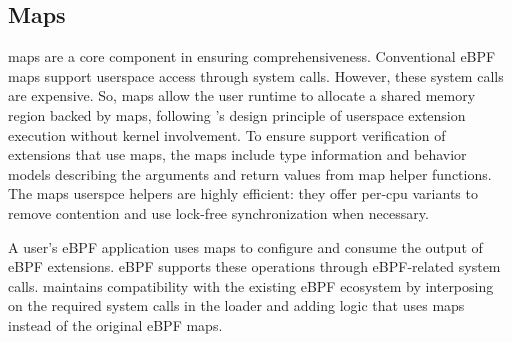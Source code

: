 \subsection{\sys Maps}\label{sec:design:maps}

\sys{} maps are a core component in ensuring comprehensiveness.   Conventional eBPF maps support userspace access through system calls. However, these system calls are expensive. So, \sys{} maps allow the \sys{} user runtime to allocate a shared memory region backed by \sys{} maps, following \sys{}'s design principle of userspace extension execution without kernel involvement. %
To ensure support verification of extensions that use \sys{} maps, the \sys{} maps include type information and behavior models describing the arguments and return values from \sys{} map helper functions. The \sys{} maps userspce helpers are highly efficient: they offer per-cpu variants to remove contention and use lock-free synchronization when necessary.

A user's eBPF application uses \sys{} maps to configure and consume the output of eBPF extensions.  eBPF supports these operations through eBPF-related system calls. \sys{} maintains compatibility with the existing eBPF ecosystem by interposing on the required system calls in the \sys{} loader and adding logic that uses \sys{} maps instead of the original eBPF maps. 




